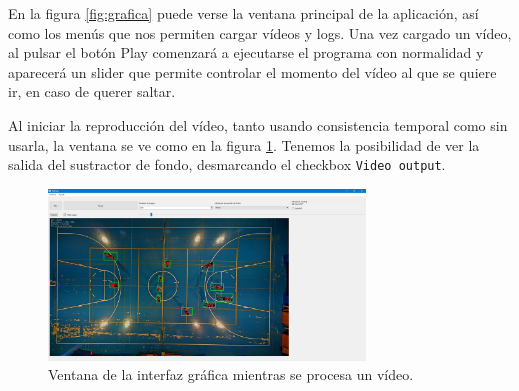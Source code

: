 En la figura \ref{fig:grafica} puede verse la ventana principal de la aplicación, así como los menús que nos permiten cargar vídeos y logs. Una vez cargado un vídeo, al pulsar el botón Play comenzará a ejecutarse el programa con normalidad y aparecerá un slider que permite controlar el momento del vídeo al que se quiere ir, en caso de querer saltar.

Al iniciar la reproducción del vídeo, tanto usando consistencia temporal como sin usarla, la ventana se ve como en la figura \ref{fig:ventanaconvideo}. Tenemos la posibilidad de ver la salida del sustractor de fondo, desmarcando el checkbox \texttt{Video output}.

\begin{figure}
    \centering
    \includegraphics[width=0.75\textwidth]{images/grafica}
    \caption{Ventana de la interfaz gráfica mientras se procesa un vídeo.}
    \label{fig:ventanaconvideo}
\end{figure}

\newpage